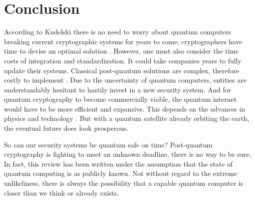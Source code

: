 \section{Conclusion}
According to Kudelski there is no need to worry about quantum computers breaking current cryptographic systems for years to come; cryptographers have time to devise an optimal solution \cite{Impact_QC_Cryptog}. However, one must also consider the time costs of integration and standardization. It could take companies years to fully update their systems. Classical post-quantum solutions are complex, therefore costly to implement \cite{Sec_Risk}. Due to the uncertainty of quantum computers, entities are understandably hesitant to hastily invest in a new security system. And for quantum cryptography to become commercially viable, the quantum internet would have to be more efficient and expansive. This depends on the advances in physics and technology \cite{Q_Cryptog}. But with a quantum satellite already orbiting the earth, the eventual future does look prosperous.

So can our security systems be quantum safe on time? Post-quantum cryptography is fighting to meet an unknown deadline, there is no way to be sure. In fact, this review has been written under the assumption that the state of quantum computing is as publicly known. Not without regard to the extreme unlikeliness, there is always the possibility that a capable quantum computer is closer than we think or already exists. 